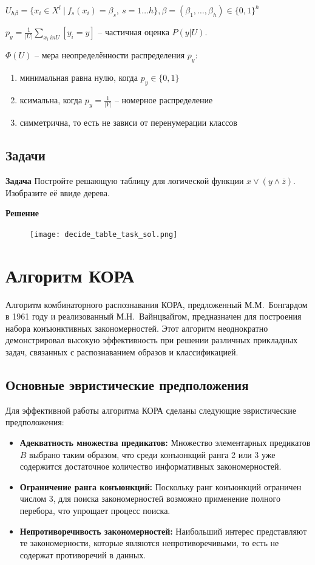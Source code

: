 $U_{h\beta} = \{ x_i \in X^l \ | \ f_s(x_i)=\beta_s,\ s=1\dots h \}, \beta=(\beta_1, \dots, \beta_h) \in \{0, 1\}^h$

$p_y =\frac{1}{|U|} \sum_{x_i \ in U}[y_i = y]$ -- частичная оценка $P(y|U)$.

$\Phi(U)$ -- мера неопределённости распределения $p_y$:
\begin{enumerate}
    \item минимальная  равна нулю, когда $p_y \in \{0,1\}$
    \item ксимальна, когда $p_y = \frac{1}{|Y|}$ -- номерное распределение
    \item симметрична, то есть не зависи от перенумерации классов
\end{enumerate}

\subsection{Задачи}

\textbf{Задача}
Постройте решающую таблицу для логической функции $x \vee (y \wedge \overline{z}).$ Изобразите её ввиде дерева.

\textbf{Решение}
\begin{figure}
    \centering
    \texttt{[image: decide\_table\_task\_sol.png]}
\end{figure}

\section{Алгоритм КОРА}

Алгоритм комбинаторного распознавания КОРА, предложенный М.М.~Бонгардом в 1961 году и реализованный М.Н.~Вайнцвайгом, предназначен для построения набора конъюнктивных закономерностей. Этот алгоритм неоднократно демонстрировал высокую эффективность при решении различных прикладных задач, связанных с распознаванием образов и классификацией.

\subsection{Основные эвристические предположения}

Для эффективной работы алгоритма КОРА сделаны следующие эвристические предположения:

\begin{itemize}
    \item \textbf{Адекватность множества предикатов:} Множество элементарных предикатов \(B\) выбрано таким образом, что среди конъюнкций ранга 2 или 3 уже содержится достаточное количество информативных закономерностей.
    \item \textbf{Ограничение ранга конъюнкций:} Поскольку ранг конъюнкций ограничен числом 3, для поиска закономерностей возможно применение полного перебора, что упрощает процесс поиска.
    \item \textbf{Непротиворечивость закономерностей:} Наибольший интерес представляют те закономерности, которые являются непротиворечивыми, то есть не содержат противоречий в данных.
\end{itemize}

